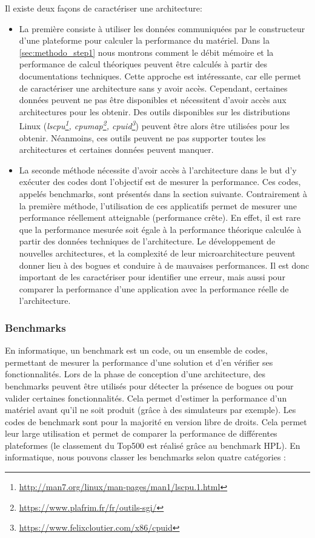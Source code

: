     Il existe deux façons de caractériser une architecture: 
    \begin{itemize}
        \item La première consiste à utiliser les données communiquées par le constructeur d'une plateforme pour calculer la performance du matériel. Dans la \autoref{sec:methodo_step1} nous montrons comment le débit mémoire et la performance de calcul théoriques peuvent être calculés à partir des documentations techniques. Cette approche est intéressante, car elle permet de caractériser une architecture sans y avoir accès. Cependant, certaines données peuvent ne pas être disponibles et nécessitent d'avoir accès aux architectures pour les obtenir. Des outils disponibles sur les distributions Linux (\textit{lscpu\footnote{\url{http://man7.org/linux/man-pages/man1/lscpu.1.html}}, cpumap\footnote{\url{https://www.plafrim.fr/fr/outils-sgi/}}, cpuid\footnote{\url{https://www.felixcloutier.com/x86/cpuid}}}) peuvent être alors être utilisées pour les obtenir. Néanmoins, ces outils peuvent ne pas supporter toutes les architectures et certaines données peuvent manquer.
    
        \item La seconde méthode nécessite d'avoir accès à l'architecture dans le but d'y exécuter des codes dont l'objectif est de mesurer la performance. Ces codes, appelés \glspl{benchmark}, sont présentés dans la section suivante. Contrairement à la première méthode, l'utilisation de ces applicatifs permet de mesurer une performance réellement atteignable (performance crête). En effet, il est rare que la performance mesurée soit égale à la performance théorique calculée à partir des données techniques de l'architecture. Le développement de nouvelles architectures, et la complexité de leur microarchitecture peuvent donner lieu à des bogues et conduire à de mauvaises performances. Il est donc important de les caractériser pour identifier une erreur, mais aussi pour comparer la performance d'une application avec la performance réelle de l'architecture.
    \end{itemize}
    
           
    \subsubsection{Benchmarks}
           
        En informatique, un \gls{benchmark} est un code, ou un ensemble de codes, permettant de mesurer la performance d'une solution et d'en vérifier ses fonctionnalités. Lors de la phase de conception d'une architecture, des benchmarks peuvent être utilisés pour détecter la présence de bogues ou pour valider certaines fonctionnalités. Cela permet d'estimer la performance d'un matériel avant qu'il ne soit produit (grâce à des simulateurs par exemple). Les codes de benchmark sont pour la majorité en version libre de droits. Cela permet leur large utilisation et permet de comparer la performance de différentes plateformes (le classement du Top500 est réalisé grâce au benchmark HPL). En informatique, nous pouvons classer les benchmarks selon quatre catégories \cite{Staelin2004}:
        
